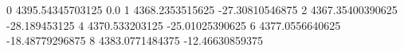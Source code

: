 0 4395.54345703125 0.0
1 4368.2353515625 -27.30810546875
2 4367.35400390625 -28.189453125
4 4370.533203125 -25.01025390625
6 4377.0556640625 -18.48779296875
8 4383.0771484375 -12.46630859375
